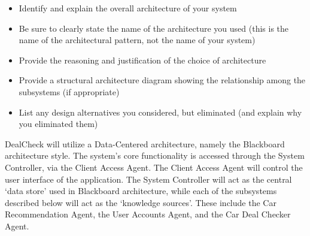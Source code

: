 \documentclass[]{article}
\begin{document}
\label{sub:system_architecture}
\begin{itemize}
	\item Identify and explain the overall architecture of your system
	\item Be sure to clearly state the name of the architecture you used (this is the name of the architectural pattern, not the name of your system)
	\item Provide the reasoning and justification of the choice of architecture
	\item Provide a structural architecture diagram showing the relationship among the subsystems (if appropriate)
	\item List any design alternatives you considered, but eliminated (and explain why you eliminated them)
\end{itemize}

DealCheck will utilize a Data-Centered architecture, namely the Blackboard architecture style. The system’s core functionality is accessed through the System Controller, via the Client Access Agent. The Client Access Agent will control the user interface of the application. The System Controller will act as the central ‘data store’ used in Blackboard architecture, while each of the subsystems described below will act as the ‘knowledge sources’. These include the Car Recommendation Agent, the User Accounts Agent, and the Car Deal Checker Agent. \\
\end{document}
